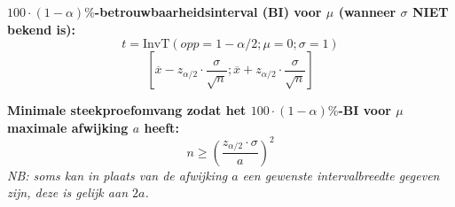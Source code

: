\documentclass[11pt,a4paper,dutch]{article} %
\begin{document}
\textbf{$100\cdot(1-\alpha)\%$-betrouwbaarheidsinterval (BI) voor $\mu$ (wanneer $\sigma$ NIET bekend is):}
\[
    t = \text{InvT}(opp=1-\alpha/2; \mu=0; \sigma=1)
\]
\[
    [\overline{x} - z_{\alpha/2} \cdot \frac{\sigma}{\sqrt{n}}; \overline{x} + z_{\alpha/2} \cdot \frac{\sigma}{\sqrt{n}}]
\]

\textbf{Minimale steekproefomvang zodat het $100\cdot(1-\alpha)\%$-BI voor $\mu$ maximale afwijking $a$ heeft:}
\[
    n \ge \left( \frac{z_{\alpha/2} \cdot \sigma}{a} \right)^2
\]
{\itshape NB: soms kan in plaats van de afwijking $a$ een gewenste intervalbreedte gegeven zijn, deze is gelijk aan $2a$.}









\end{document}

